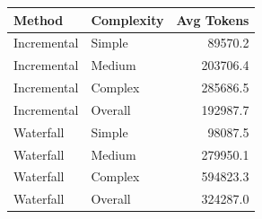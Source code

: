 \begin{tabular}{llr}
\toprule
Method & Complexity & Avg Tokens \\
\midrule
Incremental & Simple & 89570.2 \\
Incremental & Medium & 203706.4 \\
Incremental & Complex & 285686.5 \\
Incremental & Overall & 192987.7 \\
Waterfall & Simple & 98087.5 \\
Waterfall & Medium & 279950.1 \\
Waterfall & Complex & 594823.3 \\
Waterfall & Overall & 324287.0 \\
\bottomrule
\end{tabular}
